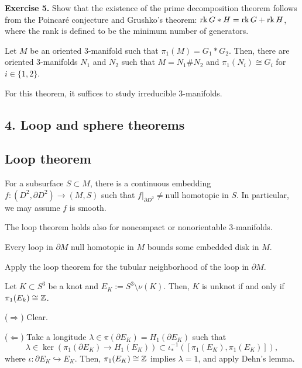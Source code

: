 \documentclass{../../../small}
\begin{document}
\noindent\textbf{Exercise 5.} Show that the existence of the prime decomposition theorem follows from the Poincar\'e conjecture and Grushko's theorem: $\operatorname{rk} G*H=\operatorname{rk} G+\operatorname{rk} H$, where the rank is defined to be the minimum number of generators.

\begin{thm}
Let $M$ be an oriented 3-manifold such that $\pi_1(M)=G_1*G_2$.
Then, there are oriented 3-manifolds $N_1$ and $N_2$ such that $M=N_1\#N_2$ and $\pi_1(N_i)\cong G_i$ for $i\in\{1,2\}$.
\end{thm}
For this theorem, it suffices to study irreducible 3-manifolds.




\setcounter{section}{4}
\setcounter{subsection}{0}
\setcounter{thm}{0}
\subsection*{4. Loop and sphere theorems}
\subsection{Loop theorem}

\begin{thm}
For a subsurface $S\subset M$, there is a continuous embedding $f:(D^2,\partial D^2)\to(M,S)$ such that $f|_{\partial D^2}\ne\text{null homotopic in }S$.
In particular, we may assume $f$ is smooth.
\end{thm}

\begin{rmk*}
The loop theorem holds also for noncompact or nonorientable 3-manifolds.
\end{rmk*}

\begin{cor}
Every loop in $\partial M$ null homotopic in $M$ bounds some embedded disk in $M$.
\end{cor}
\begin{pf}
Apply the loop theorem for the tubular neighborhood of the loop in $\partial M$.
\end{pf}

\begin{thm}
Let $K\subset S^3$ be a knot and $E_K:=S^3\setminus\nu(K)$.
Then, $K$ is unknot if and only if $\pi_1(E_k)\cong\mathbb{Z}$.
\end{thm}
\begin{pf}
($\Rightarrow$)
Clear.

($\Leftarrow$)
Take a longitude $\lambda\in\pi(\partial E_K)=H_1(\partial E_K)$ such that
\[\lambda\in\ker(\pi_1(\partial E_K)\to H_1(E_K))\subset\iota_*^{-1}([\pi_1(E_K),\pi_1(E_K)]),\]
where $\iota:\partial E_K\hookrightarrow E_K$.
Then, $\pi_1(E_K)\cong\mathbb{Z}$ implies $\lambda=1$, and apply Dehn's lemma.
\end{pf}
\end{document}
